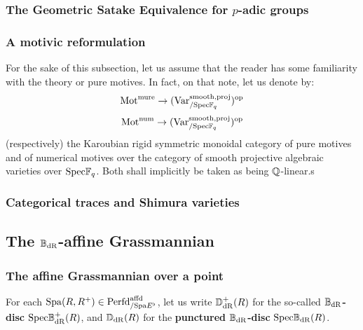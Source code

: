             \subsubsection{The Geometric Satake Equivalence for \texorpdfstring{$p$}{}-adic groups}
            
            \subsubsection{A motivic reformulation}
                \begin{convention}
                    For the sake of this subsection, let us assume that the reader has some familiarity with the theory or pure motives. In fact, on that note, let us denote by:
                        $$\mathrm{Mot}^{\mathrm{mure}} \to (\mathrm{Var}_{/\mathrm{Spec} \mathbb{F}_q}^{\mathrm{smooth}, \mathrm{proj}})^{\mathrm{op}}$$
                        $$\mathrm{Mot}^{\mathrm{num}} \to (\mathrm{Var}_{/\mathrm{Spec} \mathbb{F}_q}^{\mathrm{smooth}, \mathrm{proj}})^{\mathrm{op}}$$
                    (respectively) the Karoubian rigid symmetric monoidal category of pure motives and of numerical motives over the category of smooth projective algebraic varieties over $\mathrm{Spec} \mathbb{F}_q$. Both shall implicitly be taken as being $\mathbb{Q}$-linear.s
                \end{convention} 
            
            \subsubsection{Categorical traces and Shimura varieties}
    
        \subsection{The \texorpdfstring{$\B_{\dR}$}{}-affine Grassmannian}
            \subsubsection{The affine Grassmannian over a point}
                \begin{convention}[$\B_{\dR}$-discs]
                    For each $\mathrm{Spa}(R, R^+) \in \mathrm{Perfd}^{\mathrm{affd}}_{/\mathrm{Spa} E^{\flat}}$, let us write $\mathbb{D}_{\mathrm{dR}}^+(R)$ for the so-called \textbf{$\B_{\dR}$-disc} $\mathrm{Spec} \mathbb{B}^+_{\mathrm{dR}}(R)$, and $\mathbb{D}_{\mathrm{dR}}(R)$ for the \textbf{punctured $\B_{\dR}$-disc} $\mathrm{Spec} \mathbb{B}_{\mathrm{dR}}(R)$.
                \end{convention}
            
